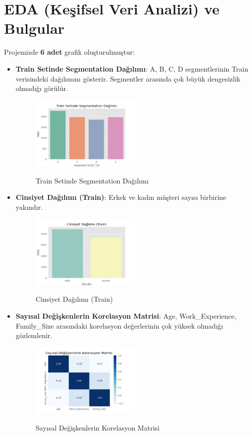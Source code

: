 \documentclass{article}
\begin{document}
\newpage

\section{EDA (Keşifsel Veri Analizi) ve Bulgular}

Projemizde \textbf{6 adet} grafik oluşturulmuştur:

\begin{itemize}
    \item \textbf{Train Setinde Segmentation Dağılımı}: A, B, C, D segmentlerinin Train verisindeki dağılımını gösterir. Segmentler arasında çok büyük dengesizlik olmadığı görülür.
    \begin{figure}[H]
    \centering
    {\shorthandoff{=}
    \includegraphics[width=0.5\textwidth]{plot_2024-12-28 15-13-04_0.png}
    }
    \caption{Train Setinde Segmentation Dağılımı}
    \end{figure}
    
    \item \textbf{Cinsiyet Dağılımı (Train)}: Erkek ve kadın müşteri sayısı birbirine yakındır.
    \begin{figure}[H]
    \centering
    {\shorthandoff{=}
    \includegraphics[width=0.5\textwidth]{plot_2024-12-28 15-13-04_1.png}
    }
    \caption{Cinsiyet Dağılımı (Train)}
    \end{figure}

    \item \textbf{Sayısal Değişkenlerin Korelasyon Matrisi}: Age, Work\_Experience, Family\_Size arasındaki korelasyon değerlerinin çok yüksek olmadığı gözlemlenir.
    \begin{figure}[H]
    \centering
    {\shorthandoff{=}
    \includegraphics[width=0.5\textwidth]{plot_2024-12-28 15-13-04_2.png}
    }
    \caption{Sayısal Değişkenlerin Korelasyon Matrisi}
    \end{figure}


\end{itemize}
\end{document}
